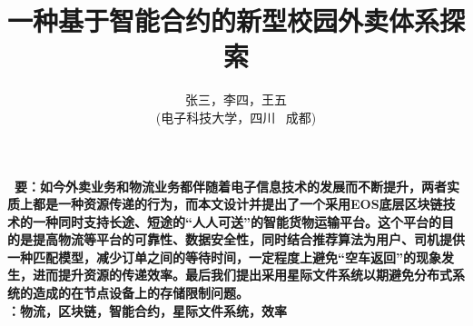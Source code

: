 \documentclass[UTF8]{ctexart}
\title{\textbf{一种基于智能合约的新型校园外卖体系探索}}
\author{\sffamily 张三，李四，王五\\ \sffamily(电子科技大学，四川 \ 成都)}
\date{}
\begin{document}
  \maketitle
  \textbf{ \ 要：\heiti  \small 如今外卖业务和物流业务都伴随着电子信息技术的发展而不断提升，两者实质上都是一种资源传递的行为，而本文设计并提出了一个采用EOS底层区块链技术的一种同时支持长途、短途的“人人可送”的智能货物运输平台。这个平台的目的是提高物流等平台的可靠性、数据安全性，同时结合推荐算法为用户、司机提供一种匹配模型，减少订单之间的等待时间，一定程度上避免“空车返回”的现象发生，进而提升资源的传递效率。最后我们提出采用星际文件系统以期避免分布式系统的造成的在节点设备上的存储限制问题。}
  \\
  \indent \textbf{：\heiti  \small 物流，区块链，智能合约，星际文件系统，效率}
  \pagestyle{plain}	%
  \\
  \\
\end{document}
